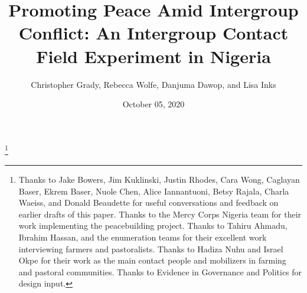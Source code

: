 \documentclass[11pt]{article}
\title{Promoting Peace Amid Intergroup Conflict: An Intergroup Contact
Field Experiment in Nigeria}
\author{\parbox{.7\linewidth}{\centering
Christopher Grady, Rebecca Wolfe, Danjuma Dawop, and Lisa Inks
}
}
\date{October 05, 2020}
\begin{document}
\VerbatimFootnotes

%
%
%
%
%
%
%
%
%
%

\newlength{\cslhangindent}
\setlength{\cslhangindent}{1.5em}
\newenvironment{cslreferences}%
  {\setlength{\parindent}{0pt}%
  \everypar{\setlength{\hangindent}{\cslhangindent}}\ignorespaces}%
  {\par}

\maketitle


\newcommand\blfootnote[1]{%
  \begingroup
  \renewcommand\thefootnote{}\footnote{#1}%
  \addtocounter{footnote}{-1}%
  \endgroup
}
\singlespacing\blfootnote{Thanks to Jake Bowers, Jim Kuklinski, Justin
Rhodes, Cara Wong, Caglayan Baser, Ekrem Baser, Nuole Chen, Alice
Iannantuoni, Betsy Rajala, Charla Waeiss, and Donald Beaudette for
useful conversations and feedback on earlier drafts of this paper.
Thanks to the Mercy Corps Nigeria team for their work implementing the
peacebuilding project. Thanks to Tahiru Ahmadu, Ibrahim Hassan, and the
enumeration teams for their excellent work interviewing farmers and
pastoralists. Thanks to Hadiza Nuhu and Israel Okpe for their work as
the main contact people and mobilizers in farming and pastoral
communities. Thanks to Evidence in Governance and Politics for design
input.}
\end{document}
